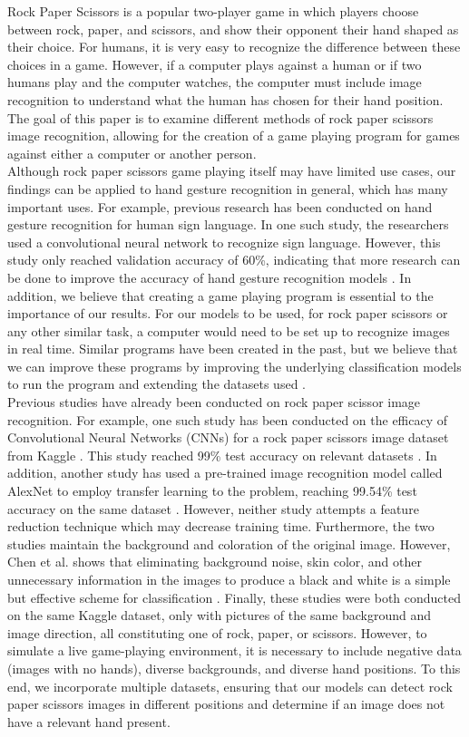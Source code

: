 \documentclass{article}
\begin{document}
Rock Paper Scissors is a popular two-player game in which players choose between rock, paper, and scissors, and show their opponent their hand shaped as their choice. For humans, it is very easy to recognize the difference between these choices in a game. However, if a computer plays against a human or if two humans play and the computer watches, the computer must include image recognition to understand what the human has chosen for their hand position. The goal of this paper is to examine different methods of rock paper scissors image recognition, allowing for the creation of a game playing program for games against either a computer or another person.\\
Although rock paper scissors game playing itself may have limited use cases, our findings can be applied to hand gesture recognition in general, which has many important uses.
For example, previous research has been conducted on hand gesture recognition for human sign language. In one such study, the researchers used a convolutional neural network to recognize sign language. However, this study only reached validation accuracy of 60\%, indicating that more research can be done to improve the accuracy of hand gesture recognition models \cite{Chowdary2023SignLR}. In addition, we believe that creating a game playing program is essential to the importance of our results. For our models to be used, for rock paper scissors or any other similar task, a computer would need to be set up to recognize images in real time. Similar programs have been created in the past, but we believe that we can improve these programs by improving the underlying classification models to run the program and extending the datasets used \cite{Aphiratsakun2020AIbasedRP}. \\
Previous studies have already been conducted on rock paper scissor image recognition. For example, one such study has been conducted on the efficacy of Convolutional Neural Networks (CNNs) for a rock paper scissors image dataset from Kaggle \cite{kaggle}. This study reached 99\% test accuracy on relevant datasets \cite{CNNM}. In addition, another study has used a pre-trained image recognition model called AlexNet to employ transfer learning to the problem, reaching 99.54\% test accuracy on the same dataset \cite{Ahmed2023RockPaperScissorsIC}. However, neither study attempts a feature reduction technique which may decrease training time. Furthermore, the two studies maintain the background and coloration of the original image. However, Chen et al. shows that eliminating background noise, skin color, and other unnecessary information in the images to produce a black and white is a simple but effective scheme for classification \cite{Chen2010RockPA}. Finally, these studies were both conducted on the same Kaggle dataset, only with pictures of the same background and image direction, all constituting one of rock, paper, or scissors. However, to simulate a live game-playing environment, it is necessary to include negative data (images with no hands), diverse backgrounds, and diverse hand positions. To this end, we incorporate multiple datasets, ensuring that our models can detect rock paper scissors images in different positions and determine if an image does not have a relevant hand present.\\
\end{document}
